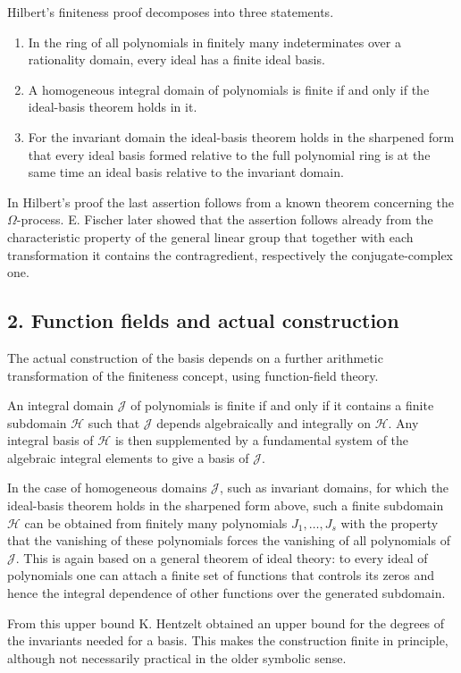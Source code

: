 \documentclass[11pt]{article}
\begin{document}
Hilbert's finiteness proof decomposes into three statements.
\begin{enumerate}
  \item In the ring of all polynomials in finitely many indeterminates over a rationality domain, every ideal has a finite ideal basis.
  \item A homogeneous integral domain of polynomials is finite if and only if the ideal-basis theorem holds in it.
  \item For the invariant domain the ideal-basis theorem holds in the sharpened form that every ideal basis formed relative to the full polynomial ring is at the same time an ideal basis relative to the invariant domain.
\end{enumerate}
In Hilbert's proof the last assertion follows from a known theorem concerning the $\Omega$-process. E. Fischer later showed that the assertion follows already from the characteristic property of the general linear group that together with each transformation it contains the contragredient, respectively the conjugate-complex one.

\subsection{2. Function fields and actual construction}

The actual construction of the basis depends on a further arithmetic transformation of the finiteness concept, using function-field theory.

An integral domain $\mathcal J$ of polynomials is finite if and only if it contains a finite subdomain $\mathcal H$ such that $\mathcal J$ depends algebraically and integrally on $\mathcal H$. Any integral basis of $\mathcal H$ is then supplemented by a fundamental system of the algebraic integral elements to give a basis of $\mathcal J$.

In the case of homogeneous domains $\mathcal J$, such as invariant domains, for which the ideal-basis theorem holds in the sharpened form above, such a finite subdomain $\mathcal H$ can be obtained from finitely many polynomials $J_1,\ldots,J_s$ with the property that the vanishing of these polynomials forces the vanishing of all polynomials of $\mathcal J$. This is again based on a general theorem of ideal theory: to every ideal of polynomials one can attach a finite set of functions that controls its zeros and hence the integral dependence of other functions over the generated subdomain.

From this upper bound K. Hentzelt obtained an upper bound for the degrees of the invariants needed for a basis. This makes the construction finite in principle, although not necessarily practical in the older symbolic sense.
\end{document}
